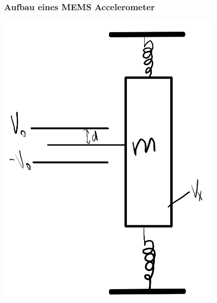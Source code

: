 \documentclass[10pt,a4paper,oneside]{beamer}
\begin{document}
\begin{frame}
	\frametitle{Aufbau eines MEMS Accelerometer}
\begin{center}
	
\includegraphics[height=0.8\textheight,keepaspectratio=true]{images/aufbau.png} \cite{Voldman07}

\end{center}
\end{frame}
\end{document}
